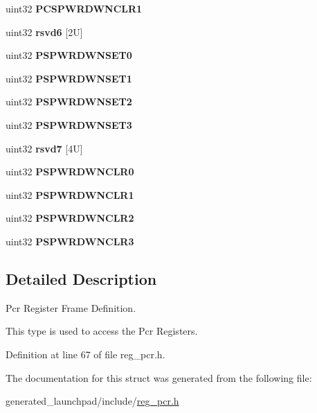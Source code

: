 \begin{DoxyCompactItemize}
uint32 {\bfseries P\+C\+S\+P\+W\+R\+D\+W\+N\+C\+L\+R1}
\item 
\mbox{\label{structpcrBase_abe453dcc4eccb3397e8b02b16c2c2762}} 
uint32 {\bfseries rsvd6} \mbox{[}2\+U\mbox{]}
\item 
\mbox{\label{structpcrBase_a737747de57d4d7107166bf233100213d}} 
uint32 {\bfseries P\+S\+P\+W\+R\+D\+W\+N\+S\+E\+T0}
\item 
\mbox{\label{structpcrBase_afff1577d584c9f69acae3632319ba08b}} 
uint32 {\bfseries P\+S\+P\+W\+R\+D\+W\+N\+S\+E\+T1}
\item 
\mbox{\label{structpcrBase_a8855ad5cd286df6e2a37ab3ec4e121aa}} 
uint32 {\bfseries P\+S\+P\+W\+R\+D\+W\+N\+S\+E\+T2}
\item 
\mbox{\label{structpcrBase_a4a7d81c94f5c7cb85495cc4361473076}} 
uint32 {\bfseries P\+S\+P\+W\+R\+D\+W\+N\+S\+E\+T3}
\item 
\mbox{\label{structpcrBase_a127ee2edc843bd2063b5f999419adab1}} 
uint32 {\bfseries rsvd7} \mbox{[}4\+U\mbox{]}
\item 
\mbox{\label{structpcrBase_a2d5b7345adcae269e686df342b1a2905}} 
uint32 {\bfseries P\+S\+P\+W\+R\+D\+W\+N\+C\+L\+R0}
\item 
\mbox{\label{structpcrBase_a97b7cc7ffc78195ed0baa0cba7b772ae}} 
uint32 {\bfseries P\+S\+P\+W\+R\+D\+W\+N\+C\+L\+R1}
\item 
\mbox{\label{structpcrBase_a0c2656c837dcf2d1629902ec60134b0e}} 
uint32 {\bfseries P\+S\+P\+W\+R\+D\+W\+N\+C\+L\+R2}
\item 
\mbox{\label{structpcrBase_a61149cc48e243aea10fe62a900234802}} 
uint32 {\bfseries P\+S\+P\+W\+R\+D\+W\+N\+C\+L\+R3}
\end{DoxyCompactItemize}


\subsection{Detailed Description}
Pcr Register Frame Definition. 

This type is used to access the Pcr Registers. 

Definition at line 67 of file reg\+\_\+pcr.\+h.



The documentation for this struct was generated from the following file\+:\begin{DoxyCompactItemize}
\item 
generated\+\_\+launchpad/include/\mbox{\hyperlink{reg__pcr_8h}{reg\+\_\+pcr.\+h}}\end{DoxyCompactItemize}
